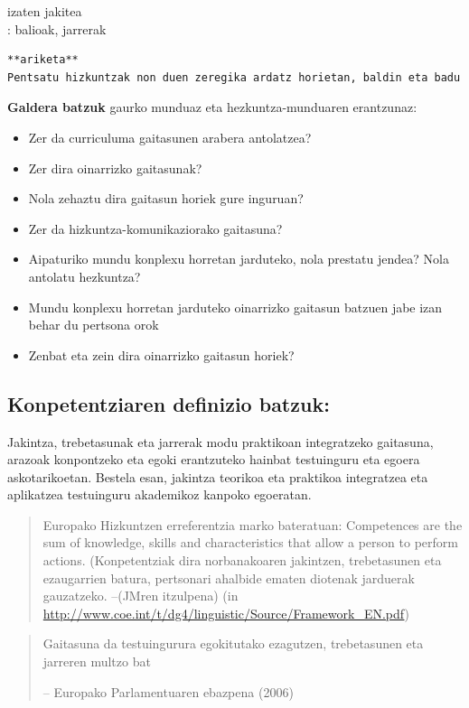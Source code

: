\documentclass[
]{book}
\begin{document}
izaten jakitea\\
: balioak, jarrerak

\begin{verbatim}
**ariketa**
Pentsatu hizkuntzak non duen zeregika ardatz horietan, baldin eta badu
\end{verbatim}

\textbf{Galdera batzuk} gaurko munduaz eta hezkuntza-munduaren erantzunaz:

\begin{itemize}
\item
  Zer da curriculuma gaitasunen arabera antolatzea?
\item
  Zer dira oinarrizko gaitasunak?
\item
  Nola zehaztu dira gaitasun horiek gure inguruan?
\item
  Zer da hizkuntza-komunikaziorako gaitasuna?
\item
  Aipaturiko mundu konplexu horretan jarduteko, nola prestatu jendea? Nola antolatu hezkuntza?
\item
  Mundu konplexu horretan jarduteko oinarrizko gaitasun batzuen jabe izan behar du pertsona orok
\item
  Zenbat eta zein dira oinarrizko gaitasun horiek?
\end{itemize}

\hypertarget{konpetentziaren-definizio-batzuk}{%
\subsection{Konpetentziaren definizio batzuk:}\label{konpetentziaren-definizio-batzuk}}

Jakintza, trebetasunak eta jarrerak modu praktikoan integratzeko gaitasuna, arazoak konpontzeko eta egoki erantzuteko hainbat testuinguru eta egoera askotarikoetan. Bestela esan, jakintza teorikoa eta praktikoa integratzea eta aplikatzea testuinguru akademikoz kanpoko egoeratan.

\begin{quote}
Europako Hizkuntzen erreferentzia marko bateratuan: Competences are the sum of knowledge, skills and characteristics that allow a person to perform actions. (Konpetentziak dira norbanakoaren jakintzen, trebetasunen eta ezaugarrien batura, pertsonari ahalbide ematen diotenak jarduerak gauzatzeko.
--(JMren itzulpena) (in \url{http://www.coe.int/t/dg4/linguistic/Source/Framework_EN.pdf})
\end{quote}

\begin{quote}
Gaitasuna da testuingurura egokitutako ezagutzen, trebetasunen eta jarreren multzo bat

-- Europako Parlamentuaren ebazpena (2006)
\end{quote}
\end{document}
